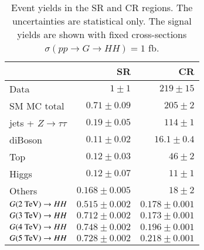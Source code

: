 
\begin{table}[htbp]
    \caption{Event yields in the SR and CR regions. The uncertainties are statistical only. 
    The signal yields are shown with fixed cross-sections $\sigma(pp\rightarrow G\rightarrow HH) = 1$ fb.}
    \label{tab:n_evt}
    \centering
    \begin{tabular}{lrr}
        \toprule
                                                            & SR                   & CR                 \\
        \midrule
        Data                                                & $1 \pm 1$             & $219   \pm 15$      \\ 
        SM MC total                                         & $0.71  \pm 0.09$      & $205   \pm 2$     \\
        \midrule
        jets + $Z\rightarrow\tau\tau$                       & $0.19  \pm 0.05$      & $114   \pm 1$       \\
        diBoson                                             & $0.11  \pm 0.02$      & $16.1  \pm 0.4$     \\  
        Top                                                 & $0.12  \pm 0.03$      & $46    \pm 2$       \\
        Higgs                                               & $0.12  \pm 0.07$      & $11    \pm 1$       \\
        Others                                              & $0.168 \pm 0.005$     & $18    \pm 2$       \\
        \midrule
        $G(2~\text{TeV})\rightarrow HH$                           & $0.515  \pm 0.002$    & $0.178  \pm 0.001$  \\
        $G(3~\text{TeV})\rightarrow HH$                           & $0.712  \pm 0.002$    & $0.173  \pm 0.001$  \\
        $G(4~\text{TeV})\rightarrow HH$                           & $0.748  \pm 0.002$    & $0.196  \pm 0.001$  \\
        $G(5~\text{TeV})\rightarrow HH$                           & $0.728  \pm 0.002$    & $0.218  \pm 0.001$  \\
        \bottomrule
    \end{tabular}
\end{table}